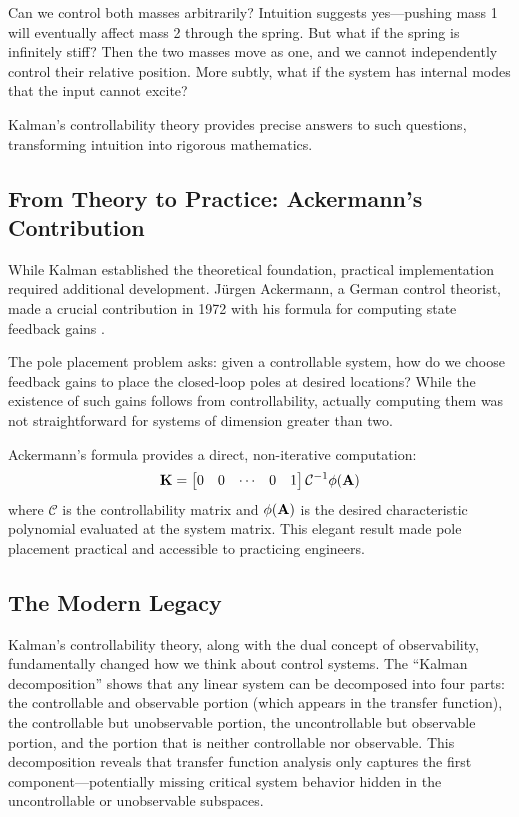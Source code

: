 Can we control both masses arbitrarily? Intuition suggests yes---pushing mass 1 will eventually affect mass 2 through the spring. But what if the spring is infinitely stiff? Then the two masses move as one, and we cannot independently control their relative position. More subtly, what if the system has internal modes that the input cannot excite?

Kalman's controllability theory provides precise answers to such questions, transforming intuition into rigorous mathematics.

\subsection{From Theory to Practice: Ackermann's Contribution}

While Kalman established the theoretical foundation, practical implementation required additional development. J\"urgen Ackermann, a German control theorist, made a crucial contribution in 1972 with his formula for computing state feedback gains \cite{ackermann1972}.

The pole placement problem asks: given a controllable system, how do we choose feedback gains to place the closed-loop poles at desired locations? While the existence of such gains follows from controllability, actually computing them was not straightforward for systems of dimension greater than two.

Ackermann's formula provides a direct, non-iterative computation:
\begin{equation}
\mathbf{K} = \begin{bmatrix} 0 & 0 & \cdots & 0 & 1 \end{bmatrix} \mathcal{C}^{-1} \phi(\mathbf{A})
\label{eq:ackermann_preview}
\end{equation}
where $\mathcal{C}$ is the controllability matrix and $\phi(\mathbf{A})$ is the desired characteristic polynomial evaluated at the system matrix. This elegant result made pole placement practical and accessible to practicing engineers.

\subsection{The Modern Legacy}

Kalman's controllability theory, along with the dual concept of observability, fundamentally changed how we think about control systems. The ``Kalman decomposition'' shows that any linear system can be decomposed into four parts: the controllable and observable portion (which appears in the transfer function), the controllable but unobservable portion, the uncontrollable but observable portion, and the portion that is neither controllable nor observable. This decomposition reveals that transfer function analysis only captures the first component---potentially missing critical system behavior hidden in the uncontrollable or unobservable subspaces.

